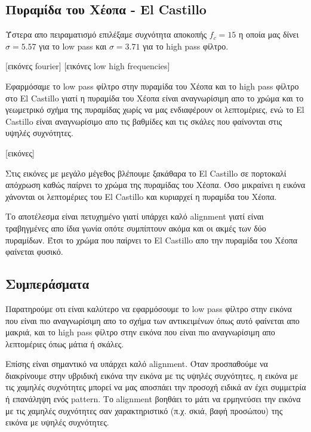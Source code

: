 \documentclass[11pt]{scrartcl} %
\begin{document}
\subsection{Πυραμίδα του Χέοπα - El Castillo}

Ύστερα απο πειραματισμό επιλέξαμε συχνότητα αποκοπής $f_c = 15$ η οποία μας δίνει $\sigma = 5.57$ για το low pass και $\sigma = 3.71$ για το high pass φίλτρο.

[εικόνες fourier]
[εικόνες low high frequencies]

Εφαρμόσαμε το low pass φίλτρο στην πυραμίδα του Χέοπα και το high pass φίλτρο στο El Castillo γιατί η πυραμίδα του Χέοπα είναι αναγνωρίσιμη απο το χρώμα και το γεωμετρικό σχήμα της πυραμίδας χωρίς να μας ενδιαφέρουν οι λεπτομέριες, ενώ το El Castillo είναι αναγνωρίσιμο απο τις βαθμίδες και τις σκάλες που φαίνονται στις υψηλές συχνότητες.

[εικόνες]

Στις εικόνες με μεγάλο μέγεθος βλέπουμε ξακάθαρα το El Castillo σε πορτοκαλί απόχρωση καθώς παίρνει το χρώμα της πυραμίδας του Χέοπα. Όσο μικραίνει η εικόνα χάνονται οι λεπτομέριες του El Castillo και κυριαρχεί η πυραμίδα του Χέοπα.

Το αποτέλεσμα είναι πετυχημένο γιατί υπάρχει καλό alignment γιατί είναι τραβηγμένες απο ίδια γωνία οπότε συμπίπτουν ακόμα και οι ακμές των δύο πυραμίδων. Έτσι το χρώμα που παίρνει το El Castillo απο την πυραμίδα του Χέοπα φαίνεται φυσικό.

\subsection{Συμπεράσματα}

Παρατηρούμε οτι είναι καλύτερο να εφαρμόσουμε το low pass φίλτρο στην εικόνα που είναι πιο αναγνωρίσιμη απο το σχήμα των αντικειμένων όπως αυτό φαίνεται απο μακριά,
και το high pass φίλτρο στην εικόνα που είναι πιο αναγνωρίσιμη απο λεπτομέριες όπως μάτια ή σκάλες.

Επίσης είναι σημαντικό να υπάρχει καλό alignment.
Όταν προσπαθούμε να διακρίνουμε στην υβριδική εικόνα την εικόνα με τις υψηλές συχνότητες, η εικόνα με τις χαμηλές συχνότητες μπορεί να μας αποσπάει την προσοχή ειδικά αν έχει συμμετρία ή επανάληψη ενός pattern.
Το alignment βοηθάει το μάτι να ερμηνεύσει την εικόνα με τις χαμηλές συχνότητες σαν χαρακτηριστικό (π.χ. σκιά, βαφή προσώπου) της εικόνα με υψηλές συχνότητες.


\end{document}

